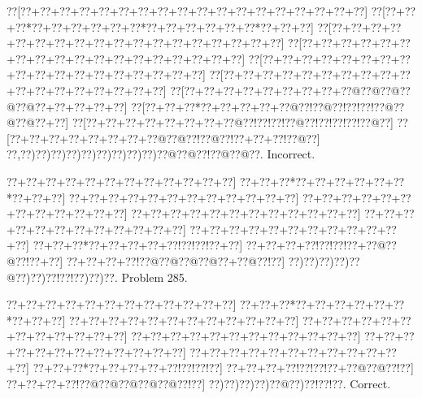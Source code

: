 \documentclass[a5paper]{article}
\begin{document}
\begin{center}
{\goo
\0??[\0??+\0??+\0??+\0??+\0??+\0??+\0??+\0??+\0??+\0??+\0??+\0??+\0??+\0??+\0??+\0??+\0??+\0??]
\0??[\0??+\0??+\0??*\0??+\0??+\0??+\0??+\0??+\0??*\0??+\0??+\0??+\0??+\0??+\0??*\0??+\0??+\0??]
\0??[\0??+\0??+\0??+\0??+\0??+\0??+\0??+\0??+\0??+\0??+\0??+\0??+\0??+\0??+\0??+\0??+\0??+\0??]
\0??[\0??+\0??+\0??+\0??+\0??+\0??+\0??+\0??+\0??+\0??+\0??+\0??+\0??+\0??+\0??+\0??+\0??+\0??]
\0??[\0??+\0??+\0??+\0??+\0??+\0??+\0??+\0??+\0??+\0??+\0??+\0??+\0??+\0??+\0??+\0??+\0??+\0??]
\0??[\0??+\0??+\0??+\0??+\0??+\0??+\0??+\0??+\0??+\0??+\0??+\0??+\0??+\0??+\0??+\0??+\0??+\0??]
\0??[\0??+\0??+\0??+\0??+\0??+\0??+\0??+\0??+\0??@\0??@\0??@\0??@\0??@\0??+\0??+\0??+\0??+\0??]
\0??[\0??+\0??+\0??*\0??+\0??+\0??+\0??+\0??@\0??!\0??@\0??!\0??!\0??!\0??@\0??@\0??@\0??+\0??]
\0??[\0??+\0??+\0??+\0??+\0??+\0??+\0??+\0??@\0??!\0??!\0??!\0??@\0??!\0??!\0??!\0??!\0??@\0??]
\0??[\0??+\0??+\0??+\0??+\0??+\0??+\0??+\0??@\0??@\0??!\0??@\0??!\0??+\0??+\0??!\0??@\0??]
\0??,\0??)\0??)\0??)\0??)\0??)\0??)\0??)\0??)\0??)\0??@\0??@\0??!\0??@\0??@\0??.
}
Incorrect. 

\end{center}
\newpage
\begin{center}
{\goo
\0??+\0??+\0??+\0??+\0??+\0??+\0??+\0??+\0??+\0??+\0??+\0??]
\0??+\0??+\0??*\0??+\0??+\0??+\0??+\0??+\0??*\0??+\0??+\0??]
\0??+\0??+\0??+\0??+\0??+\0??+\0??+\0??+\0??+\0??+\0??+\0??]
\0??+\0??+\0??+\0??+\0??+\0??+\0??+\0??+\0??+\0??+\0??+\0??]
\0??+\0??+\0??+\0??+\0??+\0??+\0??+\0??+\0??+\0??+\0??+\0??]
\0??+\0??+\0??+\0??+\0??+\0??+\0??+\0??+\0??+\0??+\0??+\0??]
\0??+\0??+\0??+\0??+\0??+\0??+\0??+\0??+\0??+\0??+\0??+\0??]
\0??+\0??+\0??*\0??+\0??+\0??+\0??+\0??!\0??!\0??!\0??+\0??]
\0??+\0??+\0??+\0??!\0??!\0??!\0??+\0??@\0??@\0??!\0??+\0??]
\0??+\0??+\0??+\0??!\0??@\0??@\0??@\0??@\0??+\0??@\0??!\0??]
\0??)\0??)\0??)\0??)\0??@\0??)\0??)\0??!\0??!\0??)\0??)\0??.
}
Problem 285.

\end{center}
\begin{center}
{\goo
\0??+\0??+\0??+\0??+\0??+\0??+\0??+\0??+\0??+\0??+\0??+\0??]
\0??+\0??+\0??*\0??+\0??+\0??+\0??+\0??+\0??*\0??+\0??+\0??]
\0??+\0??+\0??+\0??+\0??+\0??+\0??+\0??+\0??+\0??+\0??+\0??]
\0??+\0??+\0??+\0??+\0??+\0??+\0??+\0??+\0??+\0??+\0??+\0??]
\0??+\0??+\0??+\0??+\0??+\0??+\0??+\0??+\0??+\0??+\0??+\0??]
\0??+\0??+\0??+\0??+\0??+\0??+\0??+\0??+\0??+\0??+\0??+\0??]
\0??+\0??+\0??+\0??+\0??+\0??+\0??+\0??+\0??+\0??+\0??+\0??]
\0??+\0??+\0??*\0??+\0??+\0??+\0??+\0??!\0??!\0??!\0??]
\0??+\0??+\0??+\0??!\0??!\0??!\0??+\0??@\0??@\0??!\0??]
\0??+\0??+\0??+\0??!\0??@\0??@\0??@\0??@\0??@\0??!\0??]
\0??)\0??)\0??)\0??)\0??@\0??)\0??!\0??!\0??.
}
Correct. 

\end{center}
\end{document}
